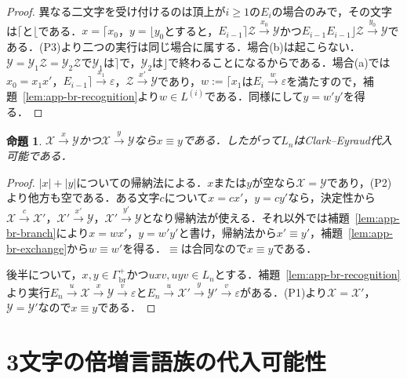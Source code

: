 \documentclass[11pt,a4paper]{ltjsarticle}
\numberwithin{equation}{section}
\theoremstyle{plain}
\newtheorem{proposition}[theorem]{命題}
\theoremstyle{definition}
\theoremstyle{remark}
\newcommand{\eps}{\varepsilon}
\begin{document}
\begin{proof}
異なる二文字を受け付けるのは頂上が$i\ge1$の$E_i$の場合のみで，その文字は$\lceil$と$\lfloor$である．$x=\lceil x_0$，$y=\lfloor y_0$とすると，$E_{i-1}\rceil\mathcal Z\xrightarrow{x_0}\mathcal Y$かつ$E_{i-1}E_{i-1}\rfloor\mathcal Z\xrightarrow{y_0}\mathcal Y$である．(P3)より二つの実行は同じ場合に属する．場合(b)は起こらない．$\mathcal Y=\mathcal Y_1\mathcal Z=\mathcal Y_2\mathcal Z$で$\mathcal Y_1$は$\rceil$で，$\mathcal Y_2$は$\rfloor$で終わることになるからである．場合(a)では$x_0=x_1x'$，$E_{i-1}\rceil\xrightarrow{x_1}\eps$，$\mathcal Z\xrightarrow{x'}\mathcal Y$であり，$w:=\lceil x_1$は$E_i\xrightarrow{w}\eps$を満たすので，補題~\ref{lem:app-br-recognition}より$w\in L^{(i)}$である．同様にして$y=w'y'$を得る．
\end{proof}

\begin{proposition}\label{prop:app-br-congruence}
$\mathcal X\xrightarrow{x}\mathcal Y$かつ$\mathcal X\xrightarrow{y}\mathcal Y$なら$x\equiv y$である．したがって$L_n$はClark--Eyraud代入可能である．
\end{proposition}

\begin{proof}
$|x|+|y|$についての帰納法による．$x$または$y$が空なら$\mathcal X=\mathcal Y$であり，(P2)より他方も空である．ある文字$c$について$x=cx'$，$y=cy'$なら，決定性から$\mathcal X\xrightarrow{c}\mathcal X'$，$\mathcal X'\xrightarrow{x'}\mathcal Y$，$\mathcal X'\xrightarrow{y'}\mathcal Y$となり帰納法が使える．それ以外では補題~\ref{lem:app-br-branch}により$x=wx'$，$y=w'y'$と書け，帰納法から$x'\equiv y'$，補題~\ref{lem:app-br-exchange}から$w\equiv w'$を得る．$\equiv$は合同なので$x\equiv y$である．

後半について，$x,y\in\Gamma_{\mathrm{br}}^+$かつ$uxv,uyv\in L_n$とする．補題~\ref{lem:app-br-recognition}より実行$E_n\xrightarrow{u}\mathcal X\xrightarrow{x}\mathcal Y\xrightarrow{v}\eps$と$E_n\xrightarrow{u}\mathcal X'\xrightarrow{y}\mathcal Y'\xrightarrow{v}\eps$がある．(P1)より$\mathcal X=\mathcal X'$，$\mathcal Y=\mathcal Y'$なので$x\equiv y$である．
\end{proof}

\section{3文字の倍増言語族の代入可能性}
\label{app:three-letter-family}
\end{document}
